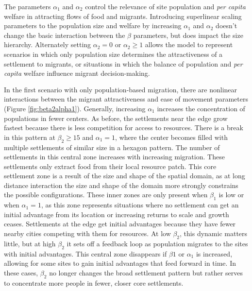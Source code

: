 \documentclass{article}
\begin{document}
The parameters $\alpha_1$ and $\alpha_2$ control the relevance of site population and \emph{per capita} welfare in attracting flows of food and migrants. Introducing superlinear scaling parameters to the population size and welfare by increasing $\alpha_1$ and $\alpha_2$ doesn't change the basic interaction between the $\beta$ parameters, but does impact the size hierarchy. Alternately setting $\alpha_2 = 0$ or $\alpha_2 \geq 1$ allows the model to represent scenarios in which only population size determines the attractiveness of a settlement to migrants, or situations in which the balance of population and \emph{per capita} welfare influence migrant decision-making. 

In the first scenario with only population-based migration, there are nonlinear interactions between the migrant attractiveness and ease of movement parameters (Figure \ref{fig:beta2alpha1}). Generally, increasing $\alpha_1$ increases the concentration of populations in fewer centers. As before, the settlements near the edge grow fastest because there is less competition for access to resources. There is a break in this pattern at $\beta_2 \geq 15$ and $\alpha_1 = 1$, where the center becomes filled with multiple settlements of similar size in a hexagon pattern. The number of settlements in this central zone increases with increasing migration. These settlements only extract food from their local resource patch. This core settlement zone is a result of the size and shape of the spatial domain, as at long distance interaction the size and shape of the domain more strongly constrains the possible configurations. These inner zones are only present when $\beta_1$ is low or when $\alpha_1 = 1$, as this zone represents situations where no settlement can get an initial advantage from its location or increasing returns to scale and growth ceases. Settlements at the edge get initial advantages because they have fewer nearby cities competing with them for resources. At low $\beta_2$, this dynamic matters little, but at high $\beta_2$ it sets off a feedback loop as population migrates to the sites with initial advantages. This central zone disappears if $\beta1$ or $\alpha_1$ is increased, allowing for some sites to gain initial advantages that feed forward in time. In these cases, $\beta_2$ no longer changes the broad settlement pattern but rather serves to concentrate more people in fewer, closer core settlements.
\end{document}
